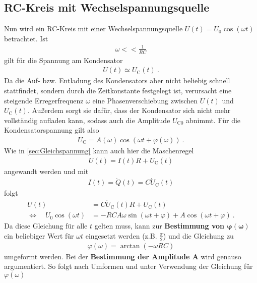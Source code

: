 \subsection{RC-Kreis mit Wechselspannungsquelle}
Nun wird ein RC-Kreis mit einer Wechselspannungsquelle $U(t) = U_0\cos(\omega t)$ betrachtet. Ist
\begin{align}
	\omega << \frac{1}{RC}
\end{align}
gilt für die Spannung am Kondensator
\begin{align}
	U(t) \simeq U_\text{C}(t) \ .
\end{align}
Da die Auf- bzw. Entladung des Kondensators aber nicht beliebig schnell stattfindet, sondern durch die Zeitkonstante festgelegt ist, verursacht eine steigende Erregerfrequenz $\omega$ eine Phasenverschiebung zwischen $U(t)$ und $U_\text{C}(t)$. Außerdem sorgt sie dafür, dass der Kondensator sich nicht mehr vollständig aufladen kann, sodass auch die Amplitude $U_{\text{C}0}$ abnimmt. Für die Kondensatorspannung gilt also
\begin{align}
	U_\text{C} = A(\omega)\cos(\omega t + \varphi(\omega)) \ .
\end{align}
Wie in \ref{sec:Gleichspannung} kann auch hier die Maschenregel
\begin{align}\label{Maschenregel}
	U(t) = I(t)R + U_\text{C}(t)
\end{align}
angewandt werden und mit
\begin{align}
	I(t) = \dot{Q}(t) = C\dot{U}_\text{C}(t)
\end{align}
folgt
\begin{align}\label{Maschenregel_DGL}
	U(t) &= C\dot{U}_\text{C}(t)R + U_\text{C}(t) \\
	\Leftrightarrow\quad U_0\cos(\omega t) &= -RCA\omega\sin(\omega t + \varphi) + A\cos(\omega t + \varphi) \ .
\end{align}
Da diese Gleichung für alle $t$ gelten muss, kann zur \textbf{Bestimmung von $\bm{\varphi(\omega)}$} ein beliebiger Wert für $\omega t$ eingesetzt werden (z.B. $\frac{\pi}{2}$) und die Gleichung zu
\begin{align}
	\varphi(\omega) = \arctan(-\omega RC)
\end{align}
umgeformt werden. Bei der \textbf{Bestimmung der Amplitude $\bm{A}$} wird genauso argumentiert. So folgt nach Umformen und unter Verwendung der Gleichung für $\varphi(\omega)$
